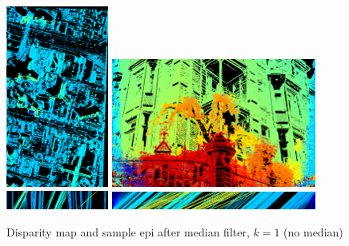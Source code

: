 \documentclass{article}
\theoremstyle{definition}
\begin{document}
\begin{figure}[ht]
  \centering
  \includegraphics[width=0.3\textwidth]{images/1520620453023_dmap.png}
  \includegraphics[width=0.6\textwidth]{images/1520620380080_dmap.png} \\
  
  \includegraphics[width=0.3\textwidth]{images/1520620453023_epi_colored.png}
  \includegraphics[width=0.6\textwidth]{images/1520618708656_epi_colored.png}
  \caption{Disparity map and sample epi after median filter, $k=1$ (no median)}
  \label{fig:median:1}
\end{figure}
\end{document}
